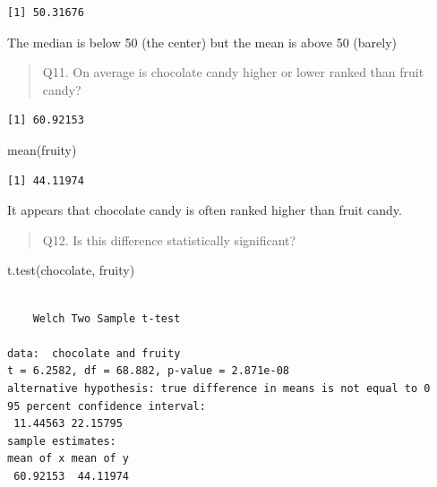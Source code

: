 \documentclass[
  letterpaper,
  DIV=11,
  numbers=noendperiod]{scrartcl}
\newenvironment{Shaded}{\begin{snugshade}}{\end{snugshade}}
\newcommand{\FunctionTok}[1]{\textcolor[rgb]{0.28,0.35,0.67}{#1}}
\newcommand{\NormalTok}[1]{\textcolor[rgb]{0.00,0.23,0.31}{#1}}
\newcommand{\OtherTok}[1]{\textcolor[rgb]{0.00,0.23,0.31}{#1}}
\newcommand{\SpecialCharTok}[1]{\textcolor[rgb]{0.37,0.37,0.37}{#1}}
\begin{document}
\begin{verbatim}
[1] 50.31676
\end{verbatim}

The median is below 50 (the center) but the mean is above 50 (barely)

\begin{quote}
Q11. On average is chocolate candy higher or lower ranked than fruit
candy?
\end{quote}

\begin{Shaded}
\end{Shaded}

\begin{verbatim}
[1] 60.92153
\end{verbatim}

\begin{Shaded}
\begin{Highlighting}[]
\FunctionTok{mean}\NormalTok{(fruity)}
\end{Highlighting}
\end{Shaded}

\begin{verbatim}
[1] 44.11974
\end{verbatim}

It appears that chocolate candy is often ranked higher than fruit candy.

\begin{quote}
Q12. Is this difference statistically significant?
\end{quote}

\begin{Shaded}
\begin{Highlighting}[]
\FunctionTok{t.test}\NormalTok{(chocolate, fruity)}
\end{Highlighting}
\end{Shaded}

\begin{verbatim}

    Welch Two Sample t-test

data:  chocolate and fruity
t = 6.2582, df = 68.882, p-value = 2.871e-08
alternative hypothesis: true difference in means is not equal to 0
95 percent confidence interval:
 11.44563 22.15795
sample estimates:
mean of x mean of y 
 60.92153  44.11974 
\end{verbatim}
\end{document}
